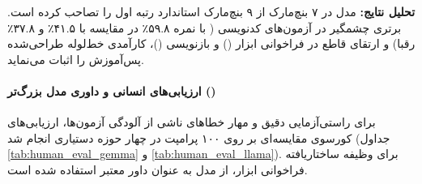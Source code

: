 \begin{table}[htbp]
\centering
\caption{مقایسه عملکرد مدل‌های دستورپذیر در مقیاس ۱ میلیارد پارامتر بر روی بنچ‌مارک‌های استاندارد}
\label{tab:mobilellm_pro_instruct_eval}
\end{table}

\textbf{تحلیل نتایج:} مدل  در ۷ بنچ‌مارک از ۹ بنچ‌مارک استاندارد رتبه اول را تصاحب کرده است. برتری چشمگیر در آزمون‌های کدنویسی ( با نمره ۵۹.۸٪ در مقایسه با ۴۱.۵٪ و ۳۷.۸٪ رقبا) و ارتقای قاطع در فراخوانی ابزار () و بازنویسی ()، کارآمدی خط‌لوله طراحی‌شده پس‌آموزش را اثبات می‌نماید.

\paragraph*{ارزیابی‌های انسانی و داوری مدل بزرگ‌تر ()}
برای راستی‌آزمایی دقیق و مهار خطاهای ناشی از آلودگی آزمون‌ها، ارزیابی‌های کورسوی مقایسه‌ای بر روی ۱۰۰ پرامپت در چهار حوزه دستیاری انجام شد (جداول \ref{tab:human_eval_gemma} و \ref{tab:human_eval_llama}). برای وظیفه ساختاریافته فراخوانی ابزار، از مدل  به عنوان داور معتبر استفاده شده است.

